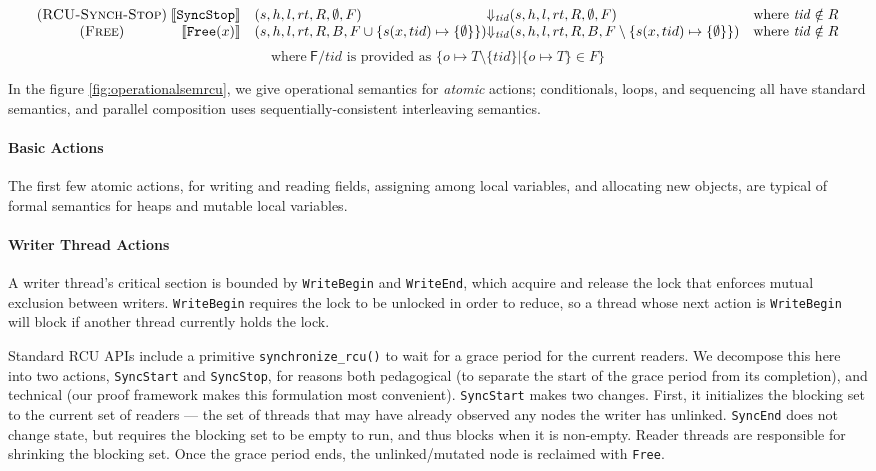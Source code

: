 \begin{figure*}
\[\begin{array}{c@{\;}rl@{\Downarrow_{\mathit{tid}}}ll}
(\textsc{RCU-Synch-Stop}) & \llbracket\texttt{SyncStop}\rrbracket & (s,h,l,rt,R,\emptyset,F) & (s,h,l,rt,R,\emptyset,F) & \textrm{where}~\mathit{tid} \notin R \\
(\textsc{Free}) & {\llbracket\texttt{Free}(x)\rrbracket} & (s,h,l,rt,R,B,F\cup \{s(x,tid)\mapsto \{\emptyset\} \}) & (s,h,l,rt,R,B,F\setminus \{s(x,tid)\mapsto \{\emptyset\} \} ) & \textrm{where}~\mathit{tid} \notin R \\
\end{array}
\]
\[\textrm{where}~ \textsf{F} / tid \textrm{ is provided as } \{o \mapsto T \setminus \{tid\} | \{o \mapsto T \} \in F \}\]
\caption{Operational Semantics for RCU Programming Model }
\label{fig:operationalsemrcu}
\end{figure*}%
In the figure \ref{fig:operationalsemrcu}, we give operational semantics for \emph{atomic} actions; conditionals, loops, and sequencing all have standard semantics, and parallel composition  uses sequentially-consistent interleaving semantics.

\paragraph{Basic Actions} The first few atomic actions, for writing and reading fields, assigning among local variables, and allocating new objects, are typical of formal semantics for heaps and mutable local variables.
\paragraph{Writer Thread Actions}
A writer thread's critical section is bounded by \lstinline|WriteBegin| and \lstinline|WriteEnd|, which acquire and release the lock that enforces mutual exclusion between writers.  \lstinline|WriteBegin| requires the lock to be unlocked in order to reduce, so a thread whose next action is \lstinline|WriteBegin| will block if another thread currently holds the lock.

Standard RCU APIs include a primitive \texttt{synchronize\_rcu()} to wait for a grace period for the current readers.  We decompose this here into two actions, \lstinline|SyncStart| and \lstinline|SyncStop|, for reasons both pedagogical (to separate the start of the grace period from its completion), and technical (our proof framework makes this formulation most convenient).
\lstinline|SyncStart| makes two changes.  First, it initializes the blocking set to the current set of readers --- the set of threads that may have already observed any nodes the writer has unlinked.
\lstinline|SyncEnd| does not change state, but requires the blocking set to be empty to run, and thus blocks when it is non-empty.  Reader threads are responsible for shrinking the blocking set. Once the grace period ends, the unlinked/mutated node is reclaimed with \lstinline|Free|.

